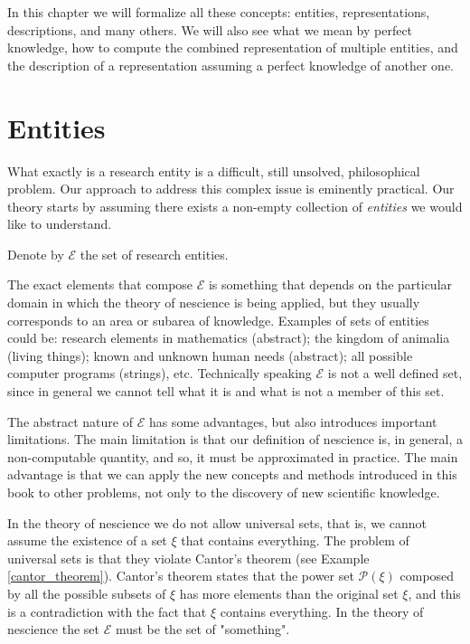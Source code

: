 In this chapter we will formalize all these concepts: entities, representations, descriptions, and many others. We will also see what we mean by perfect knowledge, how to compute the combined representation of multiple entities, and the description of a representation assuming a perfect knowledge of another one.

%
%

\section{Entities}
\label{sec:descriptions_entities}

What exactly is a research entity is a difficult, still unsolved, philosophical problem. Our approach to address this complex issue is eminently practical. Our theory starts by assuming there exists a non-empty collection of \emph{entities} we would like to understand.

\begin{notation}
Denote by $\mathcal{E}$ the set of research entities.
\end{notation}

The exact elements that compose $\mathcal{E}$ is something that depends on the particular domain in which the theory of nescience is being applied, but they usually corresponds to an area or subarea of knowledge. Examples of sets of entities could be: research elements in mathematics (abstract); the kingdom of animalia (living things); known and unknown human needs (abstract); all possible computer programs (strings), etc. Technically speaking $\mathcal{E}$ is not a well defined set, since in general we cannot tell what it is and what is not a member of this set.

The abstract nature of $\mathcal{E}$ has some advantages, but also introduces important limitations. The main limitation is that our definition of nescience is, in general, a non-computable quantity, and so, it must be approximated in practice. The main advantage is that we can apply the new concepts and methods introduced in this book to other problems, not only to the discovery of new scientific knowledge.

In the theory of nescience we do not allow universal sets, that is, we cannot assume the existence of a set $\xi$ that contains everything. The problem of universal sets is that they violate Cantor's theorem (see Example \ref{cantor_theorem}). Cantor's theorem states that the power set $\mathcal{P}(\xi)$ composed by all the possible subsets of $\xi$ has more elements than the original set $\xi$, and this is a contradiction with the fact that $\xi$ contains everything. In the theory of nescience the set $\mathcal{E}$ must be the set of "something".

